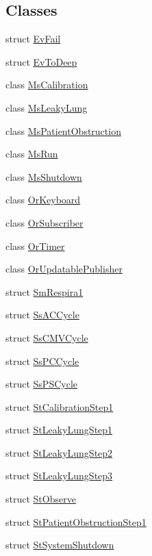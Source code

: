 \subsection*{Classes}
\begin{DoxyCompactItemize}
\item 
struct \hyperlink{structsm__respira__1_1_1EvFail}{Ev\+Fail}
\item 
struct \hyperlink{structsm__respira__1_1_1EvToDeep}{Ev\+To\+Deep}
\item 
class \hyperlink{classsm__respira__1_1_1MsCalibration}{Ms\+Calibration}
\item 
class \hyperlink{classsm__respira__1_1_1MsLeakyLung}{Ms\+Leaky\+Lung}
\item 
class \hyperlink{classsm__respira__1_1_1MsPatientObstruction}{Ms\+Patient\+Obstruction}
\item 
class \hyperlink{classsm__respira__1_1_1MsRun}{Ms\+Run}
\item 
class \hyperlink{classsm__respira__1_1_1MsShutdown}{Ms\+Shutdown}
\item 
class \hyperlink{classsm__respira__1_1_1OrKeyboard}{Or\+Keyboard}
\item 
class \hyperlink{classsm__respira__1_1_1OrSubscriber}{Or\+Subscriber}
\item 
class \hyperlink{classsm__respira__1_1_1OrTimer}{Or\+Timer}
\item 
class \hyperlink{classsm__respira__1_1_1OrUpdatablePublisher}{Or\+Updatable\+Publisher}
\item 
struct \hyperlink{structsm__respira__1_1_1SmRespira1}{Sm\+Respira1}
\item 
struct \hyperlink{structsm__respira__1_1_1SsACCycle}{Ss\+A\+C\+Cycle}
\item 
struct \hyperlink{structsm__respira__1_1_1SsCMVCycle}{Ss\+C\+M\+V\+Cycle}
\item 
struct \hyperlink{structsm__respira__1_1_1SsPCCycle}{Ss\+P\+C\+Cycle}
\item 
struct \hyperlink{structsm__respira__1_1_1SsPSCycle}{Ss\+P\+S\+Cycle}
\item 
struct \hyperlink{structsm__respira__1_1_1StCalibrationStep1}{St\+Calibration\+Step1}
\item 
struct \hyperlink{structsm__respira__1_1_1StLeakyLungStep1}{St\+Leaky\+Lung\+Step1}
\item 
struct \hyperlink{structsm__respira__1_1_1StLeakyLungStep2}{St\+Leaky\+Lung\+Step2}
\item 
struct \hyperlink{structsm__respira__1_1_1StLeakyLungStep3}{St\+Leaky\+Lung\+Step3}
\item 
struct \hyperlink{structsm__respira__1_1_1StObserve}{St\+Observe}
\item 
struct \hyperlink{structsm__respira__1_1_1StPatientObstructionStep1}{St\+Patient\+Obstruction\+Step1}
\item 
struct \hyperlink{structsm__respira__1_1_1StSystemShutdown}{St\+System\+Shutdown}
\end{DoxyCompactItemize}

